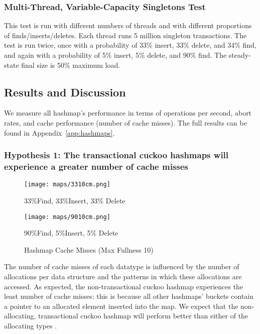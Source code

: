 \subsubsection{Multi-Thread, Variable-Capacity Singletons Test} 
This test is run with different numbers of threads and with different proportions of finds/inserts/deletes. Each thread runs 5 million singleton transactions.
The test is run twice, once with a probability of 33\% insert, 33\% delete, and 34\% find, and again with a probability of 5\% insert, 5\% delete, and 90\% find. The steady-state final size is 50\% maximum load.

\subsection{Results and Discussion}

We measure all hashmap's performance in terms of operations per second, abort rates, and cache performance (number of cache misses). 
The full results can be found in Appendix~\ref{app:hashmaps}.

\subsubsection{Hypothesis 1: The transactional cuckoo hashmaps will experience a greater number of cache misses}

    \begin{figure}[t]
    \centering
        \begin{minipage}{0.45\textwidth}
        \centering
        \texttt{[image: maps/3310cm.png]}
        \caption*{33\%Find, 33\%Insert, 33\% Delete}
        \end{minipage}
        \begin{minipage}{0.45\textwidth}
            \centering
            \texttt{[image: maps/9010cm.png]}
            \caption*{90\%Find, 5\%Insert, 5\% Delete}
        \end{minipage}
        \caption{Hashmap Cache Misses (Max Fullness 10)}
    \end{figure}


The number of cache misses of each datatype is influenced by the number of allocations per data structure and the patterns in which these allocations are accessed. As expected, the non-transactional cuckoo hashmap experiences the least number of cache misses: this is because all other hashmaps' buckets contain a pointer to an allocated element inserted into the map. We expect that the non-allocating, transactional cuckoo hashmap will perform better than either of the allocating types .

